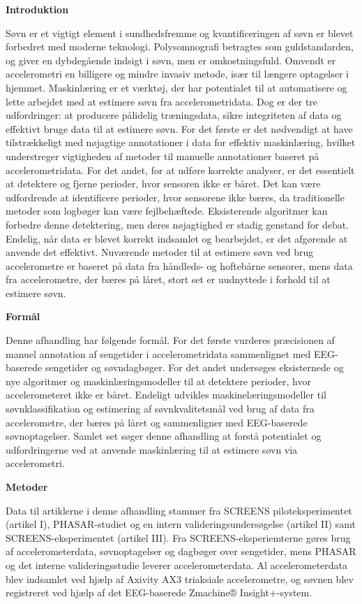 \documentclass[
  9pt,
]{scrbook}
\begin{document}
\textbf{Introduktion}

Søvn er et vigtigt element i sundhedsfremme og kvantificeringen af søvn
er blevet forbedret med moderne teknologi. Polysomnografi betragtes som
guldstandarden, og giver en dybdegående indsigt i søvn, men er
omkostningsfuld. Omvendt er accelerometri en billigere og mindre invasiv
metode, især til længere optagelser i hjemmet. Maskinlæring er et
værktøj, der har potentialet til at automatisere og lette arbejdet med
at estimere søvn fra accelerometridata. Dog er der tre udfordringer: at
producere pålidelig træningsdata, sikre integriteten af data og
effektivt bruge data til at estimere søvn. For det første er det
nødvendigt at have tilstrækkeligt med nøjagtige annotationer i data for
effektiv maskinlæring, hvilket understreger vigtigheden af metoder til
manuelle annotationer baseret på accelerometridata. For det andet, for
at udføre korrekte analyser, er det essentielt at detektere og fjerne
perioder, hvor sensoren ikke er båret. Det kan være udfordrende at
identificere perioder, hvor sensorene ikke bæres, da traditionelle
metoder som logbøger kan være fejlbehæftede. Eksisterende algoritmer kan
forbedre denne detektering, men deres nøjagtighed er stadig genstand for
debat. Endelig, når data er blevet korrekt indsamlet og bearbejdet, er
det afgørende at anvende det effektivt. Nuværende metoder til at
estimere søvn ved brug accelerometre er baseret på data fra håndleds- og
hoftebårne sensorer, mens data fra accelerometre, der bæres på låret,
stort set er uudnyttede i forhold til at estimere søvn.

\textbf{Formål}

Denne afhandling har følgende formål. For det første vurderes
præcisionen af manuel annotation af sengetider i accelerometridata
sammenlignet med EEG-baserede sengetider og søvndagbøger. For det andet
undersøges eksisternede og nye algoritmer og maskinlæringsmodeller til
at detektere perioder, hvor accelerometeret ikke er båret. Endeligt
udvikles maskinelæringsmodeller til søvnklassifikation og estimering af
søvnkvalitetsmål ved brug af data fra accelerometre, der bæres på låret
og sammenligner med EEG-baserede søvnoptagelser. Samlet set søger denne
afhandling at forstå potentialet og udfordringerne ved at anvende
maskinlæring til at estimere søvn via accelerometri.

\textbf{Metoder}

Data til artiklerne i denne afhandling stammer fra SCREENS
piloteksperimentet (artikel I), PHASAR-studiet og en intern
valideringsundersøgelse (artikel II) samt SCREENS-eksperimentet (artikel
III). Fra SCREENS-eksperiemterne gøres brug af accelerometerdata,
søvnoptagelser og dagbøger over sengetider, mens PHASAR og det interne
valideringsstudie leverer accelerometerdata. Al accelerometerdata blev
indsamlet ved hjælp af Axivity AX3 triaksiale accelerometre, og søvnen
blev registreret ved hjælp af det EEG-baserede Zmachine®
Insight+-system.
\end{document}
